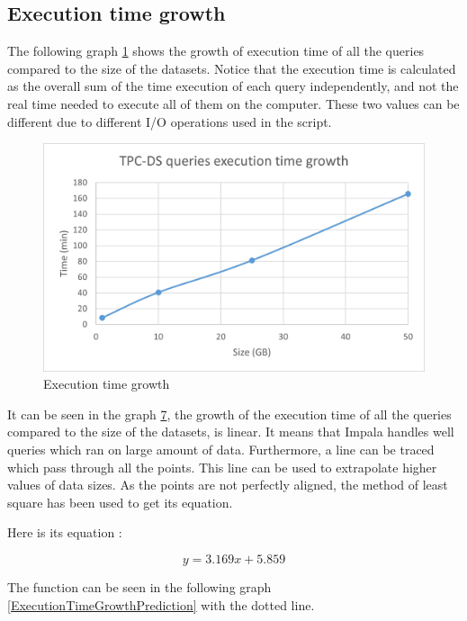\documentclass{article}
\begin{document}
\subsection{Execution time growth}

The following graph \ref{ExecutionTimeGrowth} shows the growth of execution time of all the queries compared to the size of the datasets. Notice that the execution time is calculated as the overall sum of the time execution of each query independently, and not the real time needed to execute all of them on the computer. These two values can be different due to different I/O operations used in the script.

\begin{figure}[H] 
\begin{center}
\includegraphics[width=15cm]{images/ExecutionTimegrowth.png}
\end{center}
\caption{Execution time growth}
\label{ExecutionTimeGrowth}
\end{figure} 


It can be seen in the graph \hyperref[ExecutionTimeGrowth]{7}, the growth of the execution time of all the queries compared to the size of the datasets, is linear. It means that Impala handles well queries which ran on large amount of data. Furthermore, a line can be traced which pass through all the points. This line can be used to extrapolate higher values of data sizes. As the points are not perfectly aligned, the method of least square has been used to get its equation.

Here is its equation :

$$y = 3.169x + 5.859$$


The function can be seen in the following graph \ref{ExecutionTimeGrowthPrediction} with the dotted line.
\end{document}
